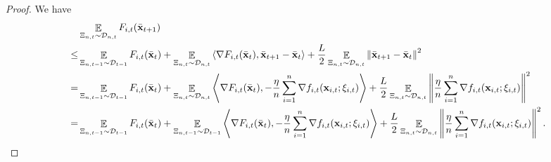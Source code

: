 \documentclass{article}
\begin{document}
\begin{proof}
We have
\begin{align}
\nonumber
& \mathop{\mathbb{E}}_{ \Xi_{n,t} \sim \mathcal{D}_{n,t} } F_{i,t}(\bar{{\bf x}}_{t+1}) \\ \nonumber
\le & \mathop{\mathbb{E}}_{ \Xi_{n,t-1} \sim \mathcal{D}_{t-1} } F_{i,t}(\bar{{\bf x}}_t) + \mathop{\mathbb{E}}_{ \Xi_{n,t} \sim \mathcal{D}_{n,t} }\left\langle\nabla F_{i,t}(\bar{{\bf x}}_t), \bar{{\bf x}}_{t+1} - \bar{{\bf x}}_t \right\rangle + \frac{L}{2}\mathop{\mathbb{E}}_{ \Xi_{n,t} \sim \mathcal{D}_{n,t} }\left\lVert\bar{{\bf x}}_{t+1} - \bar{{\bf x}}_t\right\rVert^2 \\ \nonumber
= & \mathop{\mathbb{E}}_{ \Xi_{n,t-1} \sim \mathcal{D}_{t-1} } F_{i,t}(\bar{{\bf x}}_t) + \mathop{\mathbb{E}}_{ \Xi_{n,t} \sim \mathcal{D}_{n,t} }\left\langle\nabla F_{i,t}(\bar{{\bf x}}_t), -\frac{\eta}{n}\sum_{i=1}^n \nabla f_{i,t}({\bf x}_{i,t};\xi_{i,t}) \right\rangle + \frac{L}{2} \mathop{\mathbb{E}}_{ \Xi_{n,t} \sim \mathcal{D}_{n,t} }\left\lVert\frac{\eta}{n}\sum_{i=1}^n \nabla f_{i,t}({\bf x}_{i,t};\xi_{i,t})\right\rVert^2 \\ \label{equa_lemma_gradient_norm_temp0}
= & \mathop{\mathbb{E}}_{ \Xi_{n,t-1} \sim \mathcal{D}_{t-1} } F_{i,t}(\bar{{\bf x}}_t) + \mathop{\mathbb{E}}_{ \Xi_{n,t-1} \sim \mathcal{D}_{t-1} }\left\langle\nabla F_{i,t}(\bar{{\bf x}}_t), -\frac{\eta}{n}\sum_{i=1}^n \nabla f_{i,t}({\bf x}_{i,t};\xi_{i,t}) \right\rangle + \frac{L}{2} \mathop{\mathbb{E}}_{ \Xi_{n,t} \sim \mathcal{D}_{n,t} }\left\lVert\frac{\eta}{n}\sum_{i=1}^n \nabla f_{i,t}({\bf x}_{i,t};\xi_{i,t})\right\rVert^2.
\end{align}



\end{proof}
\end{document}
